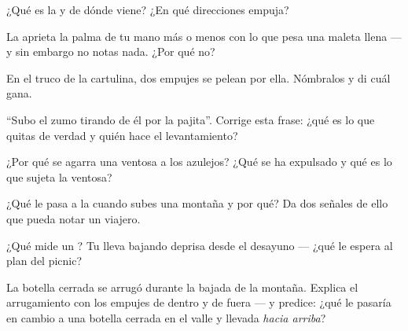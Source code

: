 \begin{exercise}[$\star$]\label{exo:g5:air-pressure-weather:2}
¿Qué es la  y de dónde viene? ¿En qué direcciones
empuja?
\end{exercise}

\begin{exercise}[$\star$]\label{exo:g5:air-pressure-weather:3}
La  aprieta la palma de tu mano más o menos con lo que
pesa una maleta llena --- y sin embargo no notas nada. ¿Por qué no?
\end{exercise}

\begin{exercise}[$\star$]\label{exo:g5:air-pressure-weather:4}
En el truco de la cartulina, dos empujes se pelean por ella.
Nómbralos y di cuál gana.
\end{exercise}

\begin{exercise}[$\star$]\label{exo:g5:air-pressure-weather:5}
``Subo el zumo tirando de él por la pajita''. Corrige esta frase: ¿qué
es lo que quitas de verdad y quién hace el levantamiento?
\end{exercise}

\begin{exercise}[$\star$]\label{exo:g5:air-pressure-weather:6}
¿Por qué se agarra una ventosa a los azulejos? ¿Qué se ha expulsado y
qué es lo que sujeta la ventosa?
\end{exercise}

\begin{exercise}[$\star$]\label{exo:g5:air-pressure-weather:7}
¿Qué le pasa a la  cuando subes una montaña y por
qué? Da dos señales de ello que pueda notar un viajero.
\end{exercise}

\begin{exercise}[$\star$]\label{exo:g5:air-pressure-weather:8}
¿Qué mide un ? Tu  lleva bajando deprisa
desde el desayuno --- ¿qué le espera al plan del picnic?
\end{exercise}

\begin{exercise}[$\star\star$]\label{exo:g5:air-pressure-weather:9}
La botella cerrada se arrugó durante la bajada de la montaña. Explica
el arrugamiento con los empujes de dentro y de fuera --- y predice:
¿qué le pasaría en cambio a una botella cerrada en el valle y llevada
\emph{hacia arriba}?
\end{exercise}

